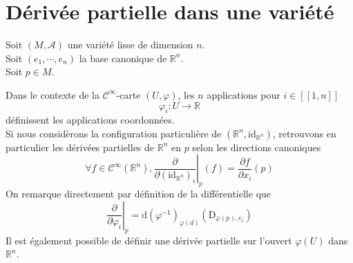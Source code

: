 \documentclass[../geometrie.tex]{subfiles}
\begin{document}
	\section{Dérivée partielle dans une variété}{
		\noindent Soit $(M, \mathcal{A})$ une variété lisse de dimension $n$. \\
		\noindent Soit $(e_{1}, \cdots, e_{n})$ la base canonique de $\mathbb{R}^{n}$. \\
		\noindent Soit $p \in M$.


		Dans le contexte de la $\mathscr{C}^{\infty}$-carte $(U, \varphi)$, les $n$ applications pour $i \in [\![1, n]\!]$
		$$
			\varphi_{i} : U \longrightarrow \mathbb{R}
		$$
		définissent les applications coordonnées. \\
		Si nous considèrons la configuration particulière de $(\mathbb{R}^{n}, \mathrm{id}_{\mathbb{R}^{n}})$, retrouvons en particulier les dérivées partielles de $\mathbb{R}^{n}$ en $p$ selon les directions canoniques
		$$
			\forall f \in \mathscr{C}^{\infty}(\mathbb{R}^{n}), \left. \frac{\partial}{\partial (\mathrm{id}_{\mathbb{R}^{n}})_{i}} \right|_{p}(f) = \frac{\partial f}{\partial x_{i}}(p)
		$$
		On remarque directement par définition de la différentielle que
		$$
			\left. \frac{\partial}{\partial \varphi_{i}} \right|_{p} = \mathrm{d}(\varphi^{-1})_{\varphi(d)}(\mathrm{D}_{\varphi(p), e_{i}})
		$$
		Il est également possible de définir une dérivée partielle sur l'ouvert $\varphi(U)$ dans $\mathbb{R}^{n}$.


}
\end{document}
